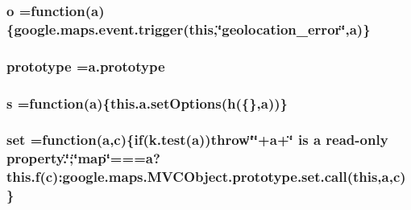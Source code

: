 \subsubsection[{\texorpdfstring{o}{o}}]{ o =function({\bf a})\{{\bf google.\+maps.\+event.\+trigger}(this,\char`\"{}geolocation\+\_\+error\char`\"{},a)\}}\hypertarget{geolocation-marker_8js_a8178d54ec302d04b918c4be66bbfda77}{}\label{geolocation-marker_8js_a8178d54ec302d04b918c4be66bbfda77}
\subsubsection[{\texorpdfstring{prototype}{prototype}}]{ prototype =a.\+prototype}\hypertarget{geolocation-marker_8js_acdc5169db2a3bf7f13f158c44020c153}{}\label{geolocation-marker_8js_acdc5169db2a3bf7f13f158c44020c153}
\subsubsection[{\texorpdfstring{s}{s}}]{ s =function({\bf a})\{this.\+a.\+set\+Options({\bf h}(\{\},{\bf a}))\}}\hypertarget{geolocation-marker_8js_a816949cf900151210fdd63791a912c07}{}\label{geolocation-marker_8js_a816949cf900151210fdd63791a912c07}
\subsubsection[{\texorpdfstring{set}{set}}]{ set =function({\bf a},{\bf c})\{{\bf if}(k.\+test({\bf a}))throw\char`\"{}\textquotesingle{}\char`\"{}+{\bf a}+\char`\"{}\textquotesingle{} is {\bf a} read-\/only property.\char`\"{};\char`\"{}{\bf map}\char`\"{}===a?{\bf this.\+f}({\bf c})\+:google.\+maps.\+M\+V\+C\+Object.\+prototype.\+set.\+call(this,{\bf a},{\bf c})\}}\hypertarget{geolocation-marker_8js_aeb07fbcc4c382b08781848394243cab9}{}\label{geolocation-marker_8js_aeb07fbcc4c382b08781848394243cab9}
